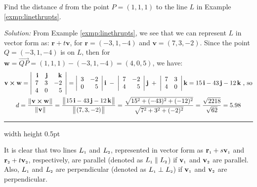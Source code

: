 \begin{exmp}
 Find the distance $d$ from the point $P = (1,1,1)$ to the line $L$ in Example \ref{exmp:linethrupts}.\vspace{1mm}
 \par\noindent\emph{Solution:} From Example \ref{exmp:linethrupts}, we see that we can represent $L$ in vector form as:
 $\textbf{r} + t \textbf{v}$, for $\textbf{r} = (-3,1,-4)$ and $\textbf{v} = (7,3,-2)$. Since the point $Q = (-3,1,-4)$
 is on $L$, then for $\textbf{w} = \overrightarrow{QP} = (1,1,1) - (-3,1,-4) = (4,0,5)$, we have:
 \begin{gather*}
  \textbf{v} \bm{\times} \textbf{w} = \left|\begin{array}{rrr}\textbf{i} & \textbf{j} & \textbf{k}\\7 & 3 & -2\\
   4 & 0 & 5\end{array}\right|
   = \left|\begin{array}{rr}3 & -2\\0 & 5\end{array}\right| \textbf{i} \;-\;
     \left|\begin{array}{rr}7 & -2\\4 & 5\end{array}\right| \textbf{j} \;+\;
     \left|\begin{array}{rr}7 & 3\\4 & 0\end{array}\right| \textbf{k}
   = 15\,\textbf{i} - 43\,\textbf{j} - 12\,\textbf{k} \text{~,~so}\\
  d = \frac{\lVert\mspace{1mu}\textbf{v} \bm{\times} \textbf{w}\mspace{1mu}\rVert}{\lVert\mspace{1mu}\textbf{v}\mspace{1mu}\rVert} =
   \frac{\bigl\lVert\mspace{1mu}15\,\textbf{i} - 43\,\textbf{j} - 12\,\textbf{k}\mspace{1mu}\bigr\rVert}{\bigl\lVert\mspace{1mu}(7,3,-2)\mspace{1mu}\bigr\rVert}
  = \frac{\sqrt{15^2 + (-43)^2 + (-12)^2}}{\sqrt{7^2 + 3^2 + (-2)^2}}
  = \frac{\sqrt{2218}}{\sqrt{62}} = 5.98
 \end{gather*}
\end{exmp}\vspace{-1mm}
\hrule width \textwidth height 0.5pt
\vspace{2mm}

It is clear that two lines $L_{\scriptscriptstyle 1}$ and $L_{\scriptscriptstyle 2}$, represented in vector form as
$\textbf{r}_{\scriptscriptstyle 1} + s \textbf{v}_{\scriptscriptstyle 1}$ and $\textbf{r}_{\scriptscriptstyle 2} + t \textbf{v}_{\scriptscriptstyle 2}$, respectively, are
parallel (denoted as $L_{\scriptscriptstyle 1} \parallel L_{\scriptscriptstyle 2}$) if $\textbf{v}_{\scriptscriptstyle 1}$ and $\textbf{v}_{\scriptscriptstyle 2}$ are
parallel. Also, $L_{\scriptscriptstyle 1}$ and $L_{\scriptscriptstyle 2}$ are perpendicular (denoted as $L_{\scriptscriptstyle 1} \perp L_{\scriptscriptstyle 2}$) if
$\textbf{v}_{\scriptscriptstyle 1}$ and $\textbf{v}_{\scriptscriptstyle 2}$ are perpendicular.

